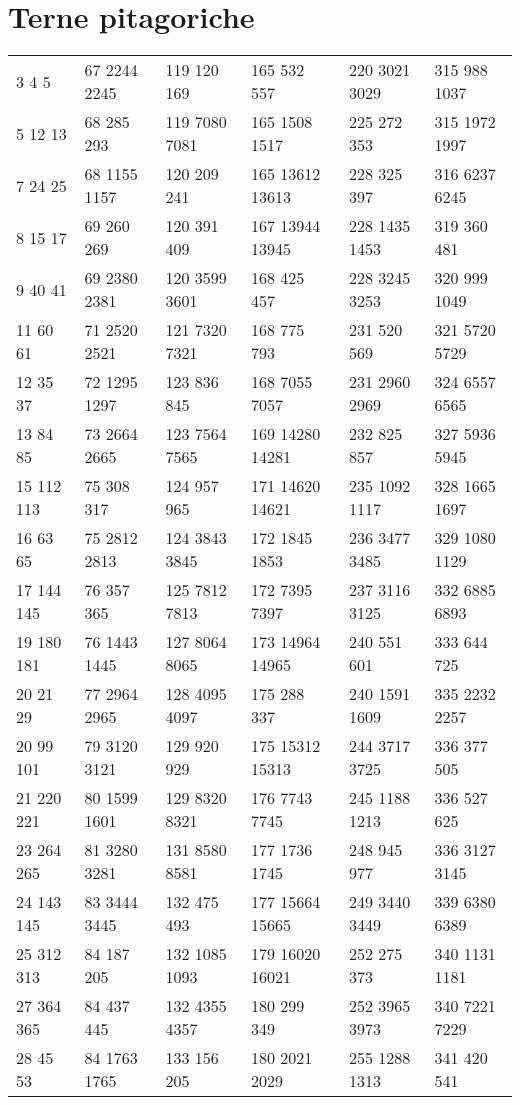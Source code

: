 \section{Terne pitagoriche}
\begin{center}
\footnotesize
\begin{longtable}{llllll}
3 4 5&67 2244 2245&119 120 169&165 532 557&220 3021 3029&315 988 1037\\
5 12 13&68 285 293&119 7080 7081&165 1508 1517&225 272 353&315 1972 1997\\
7 24 25&68 1155 1157&120 209 241&165 13612 13613&228 325 397&316 6237 6245\\
8 15 17&69 260 269&120 391 409&167 13944 13945&228 1435 1453&319 360 481\\
9 40 41&69 2380 2381&120 3599 3601&168 425 457&228 3245 3253&320 999 1049\\
11 60 61&71 2520 2521&121 7320 7321&168 775 793&231 520 569&321 5720 5729\\
12 35 37&72 1295 1297&123 836 845&168 7055 7057&231 2960 2969&324 6557 6565\\
13 84 85&73 2664 2665&123 7564 7565&169 14280 14281&232 825 857&327 5936 5945\\
15 112 113&75 308 317&124 957 965&171 14620 14621&235 1092 1117&328 1665 1697\\
16 63 65&75 2812 2813&124 3843 3845&172 1845 1853&236 3477 3485&329 1080 1129\\
17 144 145&76 357 365&125 7812 7813&172 7395 7397&237 3116 3125&332 6885 6893\\
19 180 181&76 1443 1445&127 8064 8065&173 14964 14965&240 551 601&333 644 725\\
20 21 29&77 2964 2965&128 4095 4097&175 288 337&240 1591 1609&335 2232 2257\\
20 99 101&79 3120 3121&129 920 929&175 15312 15313&244 3717 3725&336 377 505\\
21 220 221&80 1599 1601&129 8320 8321&176 7743 7745&245 1188 1213&336 527 625\\
23 264 265&81 3280 3281&131 8580 8581&177 1736 1745&248 945 977&336 3127 3145\\
24 143 145&83 3444 3445&132 475 493&177 15664 15665&249 3440 3449&339 6380 6389\\
25 312 313&84 187 205&132 1085 1093&179 16020 16021&252 275 373&340 1131 1181\\
27 364 365&84 437 445&132 4355 4357&180 299 349&252 3965 3973&340 7221 7229\\
28 45 53&84 1763 1765&133 156 205&180 2021 2029&255 1288 1313&341 420 541\\

\end{longtable}
\end{center}
